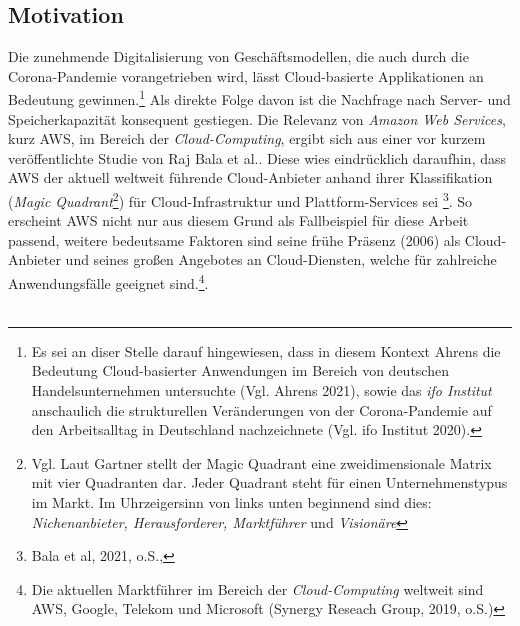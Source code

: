\subsection{Motivation}
Die zunehmende Digitalisierung von Geschäftsmodellen, die auch durch die Corona-Pandemie vorangetrieben wird, lässt Cloud-basierte Applikationen an Bedeutung gewinnen.\footnote{Es sei an diser Stelle darauf hingewiesen, dass in diesem Kontext Ahrens die Bedeutung Cloud-basierter Anwendungen im Bereich von deutschen Handelsunternehmen untersuchte (Vgl. Ahrens 2021)\cite{STA3}, sowie das \textit{ifo Institut} anschaulich die strukturellen Veränderungen von der Corona-Pandemie auf den Arbeitsalltag in Deutschland nachzeichnete (Vgl. ifo Institut 2020)\cite{STA2}.} Als direkte Folge davon ist die Nachfrage nach Server- und Speicherkapazität konsequent gestiegen.
Die Relevanz von \textit{Amazon Web Services}, kurz AWS, im Bereich der \textit{Cloud-Computing}, ergibt sich aus einer vor kurzem veröffentlichte Studie von Raj Bala et al.. Diese wies eindrücklich daraufhin, dass AWS der aktuell weltweit führende Cloud-Anbieter anhand ihrer Klassifikation (\textit{Magic Quadrant}\footnote{Vgl.  Laut Gartner stellt der Magic Quadrant eine zweidimensionale Matrix mit vier Quadranten dar. Jeder Quadrant steht für einen Unternehmenstypus im Markt. Im Uhrzeigersinn von links unten beginnend sind dies: \textit{Nichenanbieter, Herausforderer, Marktführer }und \textit{Visionäre}}) für Cloud-Infrastruktur und Plattform-Services sei \footnote{Bala et al, 2021, o.S.,\cite{G01}}.
So erscheint AWS nicht nur aus diesem Grund als Fallbeispiel für diese Arbeit passend, weitere bedeutsame Faktoren sind seine frühe Präsenz (2006) als Cloud-Anbieter und seines großen Angebotes an Cloud-Diensten, welche für zahlreiche Anwendungsfälle geeignet sind.\footnote{Die aktuellen Marktführer im Bereich der \textit{Cloud-Computing} weltweit sind AWS, Google, Telekom und Microsoft (Synergy Reseach Group, 2019, o.S.\cite{STA6})}.
\\\\

